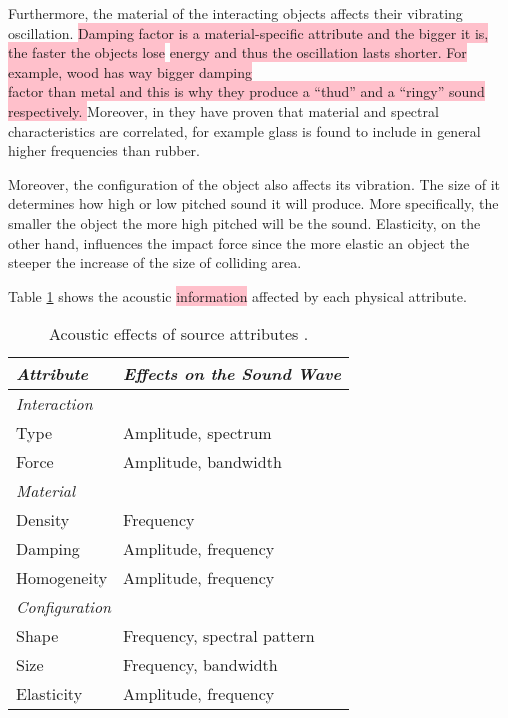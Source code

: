 Furthermore, the material of the interacting objects affects their vibrating oscillation. \colorbox{pink}{Damping factor is a material-specific attribute and the bigger it is, the faster the objects lose} \colorbox{pink}{energy and thus the oscillation lasts shorter. For example, wood has way bigger damping}\\ \colorbox{pink}{factor than metal and this is why they produce a ``thud'' and a ``ringy'' sound respectively. } Moreover, in \cite{klatzky2000perception} they have proven that material and spectral characteristics are correlated, for example glass is found to include in general higher frequencies than rubber. 

Moreover, the configuration of the object also affects its vibration. The size of it determines how high or low pitched sound it will produce. More specifically, the smaller the object the more high pitched will be the sound. Elasticity, on the other hand, influences the impact force since the more elastic an object the steeper the increase of the size of colliding area.  

Table \ref{tab:acoustic_effects} shows the acoustic \colorbox{pink}{information} affected by each physical attribute. 

\begin{table}[H]
	\centering
    \begin{tabular}{ | l | l |}
    \hline
    \textbf{\textit{Attribute}} & \textbf{\textit{Effects on the Sound Wave}} \\ \hline
    \multicolumn{2}{|l|}{\hspace{2.2cm} \textit{Interaction}} \\ \hline 
    \hspace{8pt} Type & Amplitude, spectrum \\ 
    \hspace{8pt} Force & Amplitude, bandwidth \\
    \hline
    \multicolumn{2}{|l|}{\hspace{2.2cm} \textit{Material}} \\ \hline
    \hspace{8pt} Density & Frequency \\
    \hspace{8pt} Damping & Amplitude, frequency \\
    \hspace{8pt} Homogeneity & Amplitude, frequency \\
    \hline
    \multicolumn{2}{|l|}{\hspace{2.2cm} \textit{Configuration}} \\ \hline
    \hspace{8pt} Shape & Frequency, spectral pattern \\ 
    \hspace{8pt} Size & Frequency, bandwidth \\
    \hspace{8pt} Elasticity & Amplitude, frequency \\
    \hline
    \end{tabular}
    \caption{Acoustic effects of source attributes \cite{gaver1993world}.}
    \label{tab:acoustic_effects}
\end{table}

